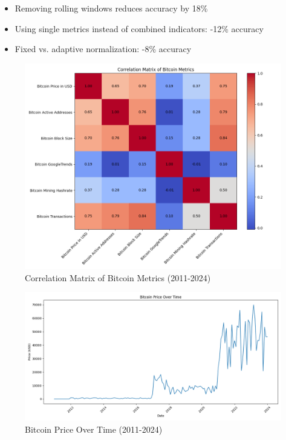 \documentclass{article} %
\begin{document}
\begin{itemize}
    \item Removing rolling windows reduces accuracy by 18\%
    \item Using single metrics instead of combined indicators: -12\% accuracy
    \item Fixed vs. adaptive normalization: -8\% accuracy
\end{itemize}

\begin{figure}[h]
    \centering
    \includegraphics[width=\textwidth]{metric_correlations.png}
    \caption{Correlation Matrix of Bitcoin Metrics (2011-2024)}
    \label{fig:metric_correlations}
\end{figure}

\begin{figure}[h]
    \centering
    \includegraphics[width=\textwidth]{price_trends.png}
    \caption{Bitcoin Price Over Time (2011-2024)}
    \label{fig:price_trends}
\end{figure}
\end{document}
